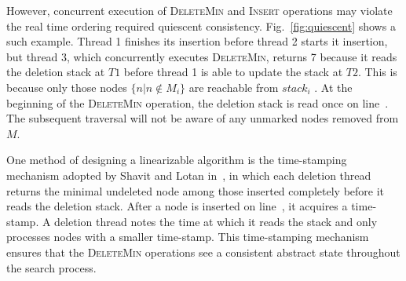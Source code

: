 \documentclass[10pt,journal,letter,compsoc]{IEEEtran}
\newtheorem{lemma}{Lemma}
\begin{document}
However, concurrent execution of \textsc{DeleteMin} and \textsc{Insert} operations may violate the real time ordering required quiescent consistency.
Fig.~\ref{fig:quiescent} shows a such example.
Thread 1 finishes its insertion before thread 2 starts it insertion, but thread 3, which concurrently executes \textsc{DeleteMin}, returns 7 because it reads the deletion stack at $T1$ before thread 1 is able to update the stack at $T2$.
This is because only those nodes $\{n|n \notin M_i\}$ are reachable from $stack_i$ .
At the beginning of the \textsc{DeleteMin} operation, the deletion stack is read once on line~.
The subsequent traversal will not be aware of any unmarked nodes removed from $M$.

One method of designing a linearizable algorithm is the time-stamping mechanism adopted by Shavit and Lotan in~\cite{shavit2000skiplist}, in which each deletion thread returns the minimal undeleted node among those inserted completely before it reads the deletion stack.
After a node is inserted on line~, it acquires a time-stamp.
A deletion thread notes the time at which it reads the stack and only processes nodes with a smaller time-stamp.  
This time-stamping mechanism ensures that the \textsc{DeleteMin} operations see a consistent abstract state throughout the search process.


\end{document}
